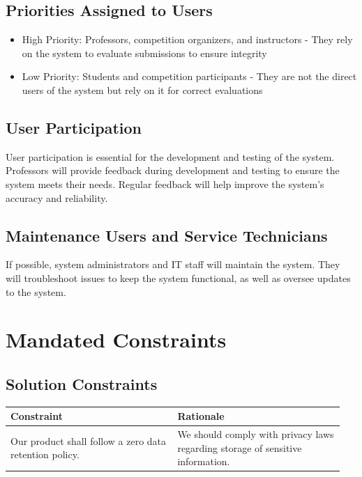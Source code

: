 \documentclass[12pt]{article}
\begin{document}
\subsection{Priorities Assigned to Users}
\begin{itemize}
    \item High Priority: Professors, competition organizers, and instructors -
    They rely on the system to evaluate submissions to ensure integrity
    \item Low Priority: Students and competition participants - They are not the
    direct users of the system but rely on it for correct evaluations
\end{itemize}

\subsection{User Participation}
User participation is essential for the development and testing of the system.
Professors will provide feedback during development and testing to ensure the
system meets their needs. Regular feedback will help improve the system's
accuracy and reliability.

\subsection{Maintenance Users and Service Technicians}
If possible, system administrators and IT staff will maintain the system. They
will troubleshoot issues to keep the system functional, as well as oversee
updates to the system.


\section{Mandated Constraints}
\subsection{Solution Constraints}
\begin{table}[h!]
    \centering
    \begin{tabular}{| p{0.475\linewidth} | p{0.475\linewidth} |}
    \hline
    \textbf{Constraint}   & \textbf{Rationale} \\
    \hline
    Our product shall follow a zero data retention policy. &
    We should comply with privacy laws regarding storage of sensitive information. \\
    \hline
    \end{tabular}
\end{table}
\end{document}
